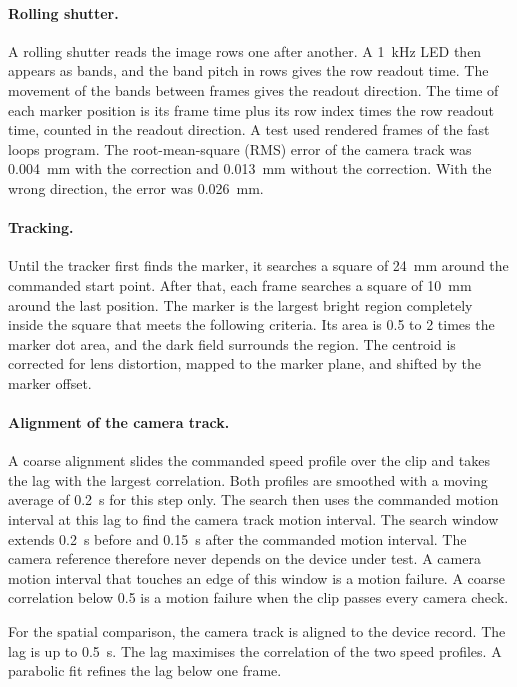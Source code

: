 \documentclass[11pt,a4paper]{article}
\begin{document}
\paragraph{Rolling shutter.}
A rolling shutter reads the image rows one after another.
A 1~kHz LED then appears as bands, and the band pitch in rows gives the row readout time.
The movement of the bands between frames gives the readout direction.
The time of each marker position is its frame time plus its row index times the row readout time, counted in the readout direction.
A test used rendered frames of the fast loops program.
The root-mean-square (RMS) error of the camera track was 0.004~mm with the correction and 0.013~mm without the correction.
With the wrong direction, the error was 0.026~mm.

\paragraph{Tracking.}
Until the tracker first finds the marker, it searches a square of 24~mm around the commanded start point.
After that, each frame searches a square of 10~mm around the last position.
The marker is the largest bright region completely inside the square that meets the following criteria.
Its area is 0.5 to 2 times the marker dot area, and the dark field surrounds the region.
The centroid is corrected for lens distortion, mapped to the marker plane, and shifted by the marker offset.

\paragraph{Alignment of the camera track.}
A coarse alignment slides the commanded speed profile over the clip and takes the lag with the largest correlation.
Both profiles are smoothed with a moving average of 0.2~s for this step only.
The search then uses the commanded motion interval at this lag to find the camera track motion interval.
The search window extends 0.2~s before and 0.15~s after the commanded motion interval.
The camera reference therefore never depends on the device under test.
A camera motion interval that touches an edge of this window is a motion failure.
A coarse correlation below 0.5 is a motion failure when the clip passes every camera check.

For the spatial comparison, the camera track is aligned to the device record.
The lag is up to 0.5~s.
The lag maximises the correlation of the two speed profiles.
A parabolic fit refines the lag below one frame.
\end{document}
